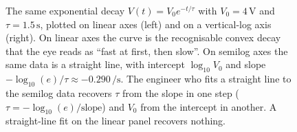 \begin{figure}[htbp]
{\begin{tikzpicture}
\end{tikzpicture}%
}%
\caption[An exponential decay on linear and semilog axes]{The same
exponential decay $V(t) = V_{0} e^{-t/\tau}$ with $V_{0} =
4\,\si{\volt}$ and $\tau = 1.5\,\si{\second}$, plotted on linear
axes (left) and on a vertical-log axis (right). On linear axes the
curve is the recognisable convex decay that the eye reads as ``fast
at first, then slow''. On semilog axes the same data is a straight
line, with intercept $\log_{10} V_{0}$ and slope $-\log_{10}(e)/\tau
\approx -0.290\,\si{\per\second}$. The engineer who fits a straight
line to the semilog data recovers $\tau$ from the slope in one step
($\tau = -\log_{10}(e) / \text{slope}$) and $V_{0}$ from the
intercept in another. A straight-line fit on the linear panel
recovers nothing.}
\label{fig:vol02:ch02:semilog-decay}
\end{figure}
